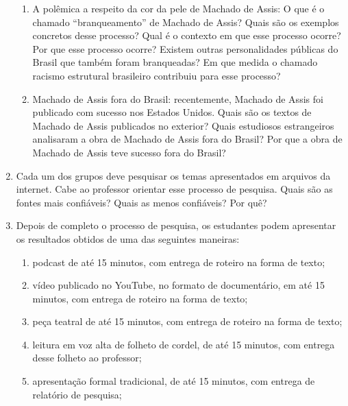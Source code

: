 \documentclass[11pt]{extarticle}
\begin{document}
\begin{enumerate}
\begin{enumerate}
\item A polêmica a respeito da cor da pele de Machado de Assis: O que é o
chamado ``branqueamento'' de Machado de Assis? Quais são os exemplos
concretos desse processo? Qual é o contexto em que esse processo ocorre?
Por que esse processo ocorre? Existem outras personalidades públicas do
Brasil que também foram branqueadas? Em que medida o chamado racismo
estrutural brasileiro contribuiu para esse processo?

\item Machado de Assis fora do Brasil: recentemente, Machado de Assis foi
publicado com sucesso nos Estados Unidos. Quais são os textos de Machado
de Assis publicados no exterior? Quais estudiosos estrangeiros
analisaram a obra de Machado de Assis fora do Brasil? Por que a obra de
Machado de Assis teve sucesso fora do Brasil?


\end{enumerate}

\item
Cada um dos grupos deve pesquisar os temas apresentados em arquivos
da internet. Cabe ao professor orientar esse processo de pesquisa. Quais
são as fontes mais confiáveis? Quais as menos confiáveis? Por quê?

\item
Depois de completo o processo de pesquisa, os estudantes podem
apresentar os resultados obtidos de uma das seguintes maneiras:

\begin{enumerate}
\item podcast de até 15 minutos, com entrega de roteiro na forma de texto;

\item vídeo publicado no YouTube, no formato de documentário, em até 15
minutos, com entrega de roteiro na forma de texto;

\item peça teatral de até 15 minutos, com entrega de roteiro na forma de
texto;

\item leitura em voz alta de folheto de cordel, de até 15 minutos, com
entrega desse folheto ao professor;

\item apresentação formal tradicional, de até 15 minutos, com entrega de
relatório de pesquisa;


\end{enumerate}
\end{enumerate}
\end{document}
